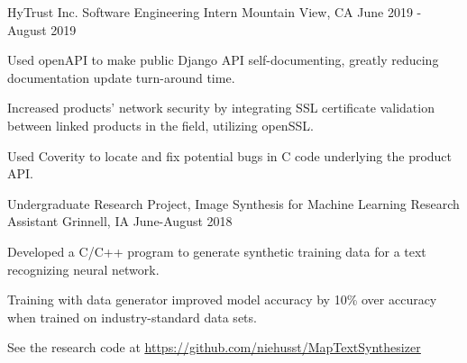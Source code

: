 \documentclass[12pt, a4paper]{awesome-cv}
\begin{document}
\begin{cventries}

  \cventry
    {HyTrust Inc.}
    {Software Engineering Intern}
    {Mountain View, CA}
    {June 2019 - August 2019}
    {
      \begin{cvitems}
      	\item {Used openAPI to make public Django API self-documenting, greatly reducing documentation update turn-around time.}
	      \item {Increased products' network security by integrating SSL certificate validation between linked products in the field, utilizing openSSL.}
	      \item {Used Coverity to locate and fix potential bugs in C code underlying the product API.}
      \end{cvitems}
    }



  \cventry
    {Undergraduate Research Project, Image Synthesis for Machine Learning}
    {Research Assistant}
    {Grinnell, IA}
    {June-August 2018}
    {
      \begin{cvitems}
        \item{Developed a C/C++ program to generate synthetic training data for a text recognizing neural network.}
        \item{Training with data generator improved model accuracy by 10\% over accuracy when trained on industry-standard data sets.}
	      \item{See the research code at \underline{\href{https://github.com/niehusst/MapTextSynthesizer}{https://github.com/niehusst/MapTextSynthesizer}}}
      \end{cvitems}
    }



\end{cventries}
\end{document}
